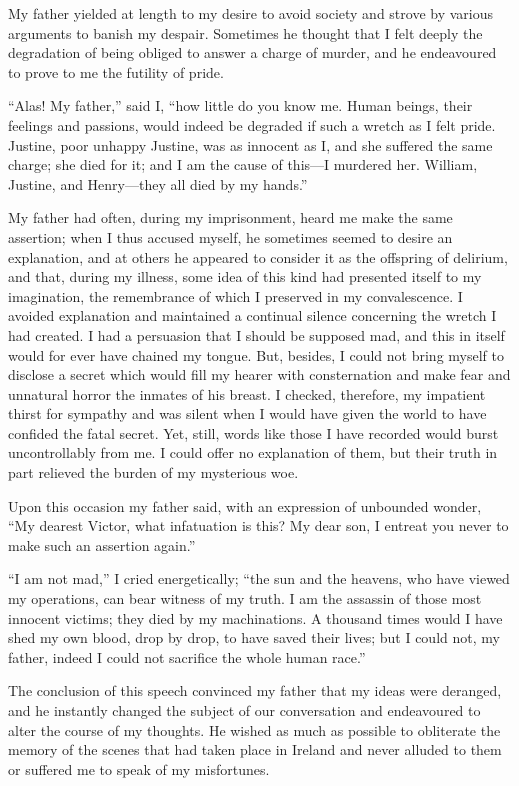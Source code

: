 \documentclass[12pt,openright]{book}
\begin{document}
My father yielded at length to my desire to avoid society and strove by various arguments to banish my despair. Sometimes he thought that I felt deeply the degradation of being obliged to answer a charge of murder, and he endeavoured to prove to me the futility of pride.

“Alas! My father,” said I, “how little do you know me. Human beings, their feelings and passions, would indeed be degraded if such a wretch as I felt pride. Justine, poor unhappy Justine, was as innocent as I, and she suffered the same charge; she died for it; and I am the cause of this—I murdered her. William, Justine, and Henry—they all died by my hands.”

My father had often, during my imprisonment, heard me make the same assertion; when I thus accused myself, he sometimes seemed to desire an explanation, and at others he appeared to consider it as the offspring of delirium, and that, during my illness, some idea of this kind had presented itself to my imagination, the remembrance of which I preserved in my convalescence. I avoided explanation and maintained a continual silence concerning the wretch I had created. I had a persuasion that I should be supposed mad, and this in itself would for ever have chained my tongue. But, besides, I could not bring myself to disclose a secret which would fill my hearer with consternation and make fear and unnatural horror the inmates of his breast. I checked, therefore, my impatient thirst for sympathy and was silent when I would have given the world to have confided the fatal secret. Yet, still, words like those I have recorded would burst uncontrollably from me. I could offer no explanation of them, but their truth in part relieved the burden of my mysterious woe.

Upon this occasion my father said, with an expression of unbounded wonder, “My dearest Victor, what infatuation is this? My dear son, I entreat you never to make such an assertion again.”

“I am not mad,” I cried energetically; “the sun and the heavens, who have viewed my operations, can bear witness of my truth. I am the assassin of those most innocent victims; they died by my machinations. A thousand times would I have shed my own blood, drop by drop, to have saved their lives; but I could not, my father, indeed I could not sacrifice the whole human race.”

The conclusion of this speech convinced my father that my ideas were deranged, and he instantly changed the subject of our conversation and endeavoured to alter the course of my thoughts. He wished as much as possible to obliterate the memory of the scenes that had taken place in Ireland and never alluded to them or suffered me to speak of my misfortunes.
\end{document}
